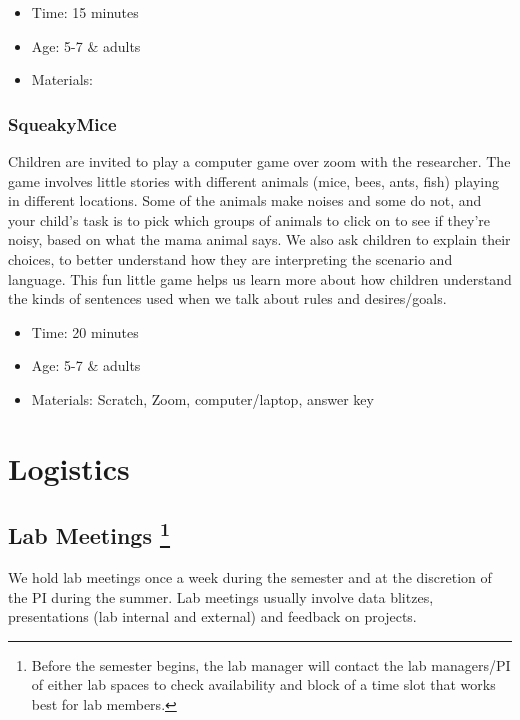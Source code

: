 \documentclass[
]{book}
\providecommand{\tightlist}{%
  \setlength{\itemsep}{0pt}\setlength{\parskip}{0pt}}
\begin{document}
\begin{itemize}
\tightlist
\item
  Time: 15 minutes
\item
  Age: 5-7 \& adults
\item
  Materials:
\end{itemize}

\hypertarget{squeakymice}{%
\subsection*{SqueakyMice}\label{squeakymice}}

Children are invited to play a computer game over zoom with the researcher. The game involves little stories with different animals (mice, bees, ants, fish) playing in different locations. Some of the animals make noises and some do not, and your child's task is to pick which groups of animals to click on to see if they're noisy, based on what the mama animal says. We also ask children to explain their choices, to better understand how they are interpreting the scenario and language. This fun little game helps us learn more about how children understand the kinds of sentences used when we talk about rules and desires/goals.

\begin{itemize}
\tightlist
\item
  Time: 20 minutes
\item
  Age: 5-7 \& adults
\item
  Materials: Scratch, Zoom, computer/laptop, answer key
\end{itemize}

\hypertarget{logistics}{%
\chapter{Logistics}\label{logistics}}

\hypertarget{lab-meetings}{%
\section[Lab Meetings ]{\texorpdfstring{Lab Meetings \footnote{Before the semester begins, the lab manager will contact the lab managers/PI of either lab spaces to check availability and block of a time slot that works best for lab members.}}{Lab Meetings }}\label{lab-meetings}}

We hold lab meetings once a week during the semester and at the discretion of the PI during the summer. Lab meetings usually involve data blitzes, presentations (lab internal and external) and feedback on projects.
\end{document}
